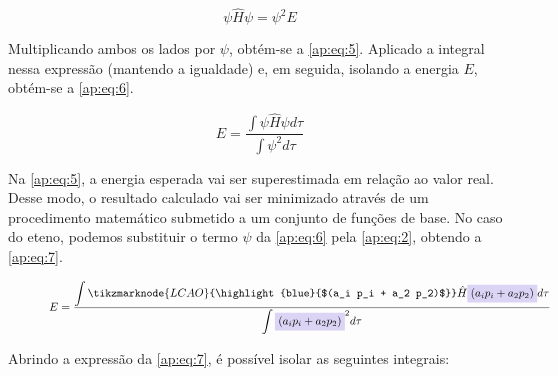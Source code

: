 
\begin{figure}[htb]
    \vspace{2\baselineskip}
\begin{equation}
\label{ap:eq:5}
    \psi \hat{H} \psi = \psi^2 E
\end{equation}
\end{figure}

Multiplicando ambos os lados por $\psi$, obtém-se a \autoref{ap:eq:5}. Aplicado a integral nessa expressão (mantendo a igualdade) e, em seguida, isolando a energia $E$, obtém-se a \autoref{ap:eq:6}.

\begin{figure}[htb]
    \vspace{2\baselineskip}
\begin{equation}
\label{ap:eq:6}
    E = \frac{\displaystyle \int \psi \hat{H} \psi d\tau}{\displaystyle \int \psi^2 d\tau}
\end{equation}
\end{figure}

Na \autoref{ap:eq:5}, a energia esperada vai ser superestimada em relação ao valor real. Desse modo, o resultado calculado vai ser minimizado através de um procedimento matemático submetido a um conjunto de funções de base. No caso do eteno, podemos substituir o termo $\psi$ da \autoref{ap:eq:6} pela \autoref{ap:eq:2}, obtendo a \autoref{ap:eq:7}.

\begin{figure}[htb]
    \vspace{2\baselineskip}
\begin{equation}
\label{ap:eq:7}
    E = \frac{\displaystyle \int \tikzmarknode{LCAO}{\highlight{blue}{$(a_i p_i + a_2 p_2)$}} \hat{H} \highlight{blue}{$(a_i p_i + a_2 p_2)$} d\tau}{\displaystyle \int \highlight{blue}{$(a_i p_i + a_2 p_2)$}^2 d\tau}
\end{equation}
\end{figure}

Abrindo a expressão da \autoref{ap:eq:7}, é possível isolar as seguintes integrais:

